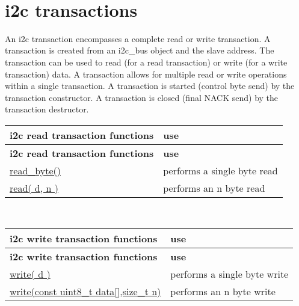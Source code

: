 ~\newline
 

\hypertarget{i2c_i2c-transactions}{}\section{i2c transactions}\label{i2c_i2c-transactions}
An i2c transaction encompasses a complete read or write transaction. A transaction is created from an i2c\+\_\+bus object and the slave address. The transaction can be used to read (for a read transaction) or write (for a write transaction) data. A transaction allows for multiple read or write operations within a single transaction. A transaction is started (control byte send) by the transaction constructor. A transaction is closed (final N\+A\+CK send) by the transaction destructor.

\tabulinesep=1mm
\begin{longtabu} spread 0pt [c]{*{2}{|X[-1]}|}
\hline
\rowcolor{\tableheadbgcolor}\textbf{ i2c read transaction functions }&\textbf{ use  }\\
\endfirsthead
\hline
\endfoot
\hline
\rowcolor{\tableheadbgcolor}\textbf{ i2c read transaction functions }&\textbf{ use  }\\
\endhead
\hyperlink{classhwlib_1_1i2c__read__transaction_a404a7d9db0ddd18aaeac84b266e89f9e}{read\+\_\+byte()} &performs a single byte read \\
\hyperlink{classhwlib_1_1i2c__read__transaction_a4c886112d92dddb502cb18a18c3a385f}{read( d, n )} &performs an n byte read \\
\end{longtabu}
~\newline


\tabulinesep=1mm
\begin{longtabu} spread 0pt [c]{*{2}{|X[-1]}|}
\hline
\rowcolor{\tableheadbgcolor}\textbf{ i2c write transaction functions }&\textbf{ use  }\\
\endfirsthead
\hline
\endfoot
\hline
\rowcolor{\tableheadbgcolor}\textbf{ i2c write transaction functions }&\textbf{ use  }\\
\endhead
\hyperlink{classhwlib_1_1i2c__write__transaction_a15fdb954f92b784f2d723892b57f6728}{write( d )} &performs a single byte write \\
\hyperlink{classhwlib_1_1i2c__write__transaction_a15fdb954f92b784f2d723892b57f6728}{write(const uint8\+\_\+t data\mbox{[}\mbox{]},size\+\_\+t n)} &performs an n byte write \\
\end{longtabu}


